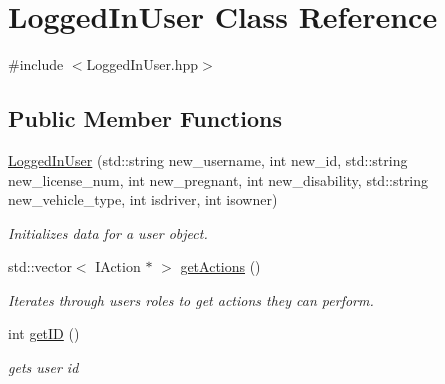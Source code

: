 \hypertarget{class_logged_in_user}{}\section{Logged\+In\+User Class Reference}
\label{class_logged_in_user}


{\ttfamily \#include $<$Logged\+In\+User.\+hpp$>$}

\subsection*{Public Member Functions}
\begin{DoxyCompactItemize}
\item 
\mbox{\hyperlink{class_logged_in_user_a02eaa5c2b719e289d76a63cfc8384627}{Logged\+In\+User}} (std\+::string new\+\_\+username, int new\+\_\+id, std\+::string new\+\_\+license\+\_\+num, int new\+\_\+pregnant, int new\+\_\+disability, std\+::string new\+\_\+vehicle\+\_\+type, int isdriver, int isowner)
\begin{DoxyCompactList}\small\item\em Initializes data for a user object. \end{DoxyCompactList}\item 
std\+::vector$<$ I\+Action $\ast$ $>$ \mbox{\hyperlink{class_logged_in_user_a54faf00007fd3669d37ed5ccfa187ce7}{get\+Actions}} ()
\begin{DoxyCompactList}\small\item\em Iterates through users roles to get actions they can perform. \end{DoxyCompactList}\item 
int \mbox{\hyperlink{class_logged_in_user_a427203000b884691867e59bef1e05efc}{get\+ID}} ()
\begin{DoxyCompactList}\small\item\em gets user id \end{DoxyCompactList}\end{DoxyCompactItemize}
